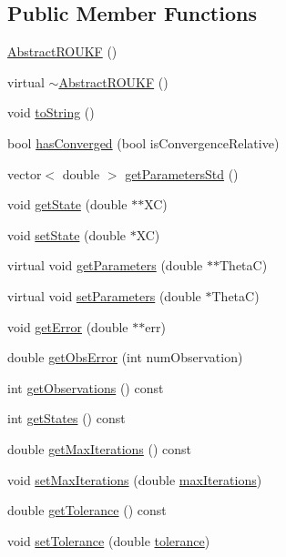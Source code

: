 \subsection*{Public Member Functions}
\begin{DoxyCompactItemize}
\item 
\mbox{\hyperlink{classAbstractROUKF_afbeabf5f80a3cd9dcbd9c551cde20cfe}{Abstract\+R\+O\+U\+KF}} ()
\item 
virtual \mbox{\hyperlink{classAbstractROUKF_a6b02fbadd6db005bb85fc364fbe5d7f9}{$\sim$\+Abstract\+R\+O\+U\+KF}} ()
\item 
void \mbox{\hyperlink{classAbstractROUKF_a663975374b647bd1ce1b4dc54e937de9}{to\+String}} ()
\item 
bool \mbox{\hyperlink{classAbstractROUKF_a7f9deb98273cfc2282e2902cdf716bff}{has\+Converged}} (bool is\+Convergence\+Relative)
\item 
vector$<$ double $>$ \mbox{\hyperlink{classAbstractROUKF_a210b89fa43dd6c6f658518d24dcc9c9c}{get\+Parameters\+Std}} ()
\item 
void \mbox{\hyperlink{classAbstractROUKF_ad24dafa1f4cb02a38958264740588b87}{get\+State}} (double $\ast$$\ast$XC)
\item 
void \mbox{\hyperlink{classAbstractROUKF_a618f4719892c0997e5f62cc23913aa12}{set\+State}} (double $\ast$XC)
\item 
virtual void \mbox{\hyperlink{classAbstractROUKF_a1fa0b3e17f2618789dca9319bd755830}{get\+Parameters}} (double $\ast$$\ast$ThetaC)
\item 
virtual void \mbox{\hyperlink{classAbstractROUKF_a8e8f7c34007a2363530f7cca4cfb0c9f}{set\+Parameters}} (double $\ast$ThetaC)
\item 
void \mbox{\hyperlink{classAbstractROUKF_aff309e6f34502fe604b1130a4185cb56}{get\+Error}} (double $\ast$$\ast$err)
\item 
double \mbox{\hyperlink{classAbstractROUKF_ae3daccd71ef910705d340567a22abdff}{get\+Obs\+Error}} (int num\+Observation)
\item 
int \mbox{\hyperlink{classAbstractROUKF_af26c89f7ed4191cbf41d945808d0daee}{get\+Observations}} () const
\item 
int \mbox{\hyperlink{classAbstractROUKF_a904fa28784c0bf5ed96502b6bea74346}{get\+States}} () const
\item 
double \mbox{\hyperlink{classAbstractROUKF_ac1d872b69fb061600b259d13b2add657}{get\+Max\+Iterations}} () const
\item 
void \mbox{\hyperlink{classAbstractROUKF_affbf7bade0ebe7441377f88e6461e84f}{set\+Max\+Iterations}} (double \mbox{\hyperlink{classAbstractROUKF_a268b49ab648ee8013b15ef5127d4fef1}{max\+Iterations}})
\item 
double \mbox{\hyperlink{classAbstractROUKF_a408197857ee4f8084170a8240db1eb29}{get\+Tolerance}} () const
\item 
void \mbox{\hyperlink{classAbstractROUKF_afc0c756daaba8dbaa4da1e38c97a16e2}{set\+Tolerance}} (double \mbox{\hyperlink{classAbstractROUKF_aecf6562ecf3ea0bef0d4875cae682b11}{tolerance}})
\end{DoxyCompactItemize}
